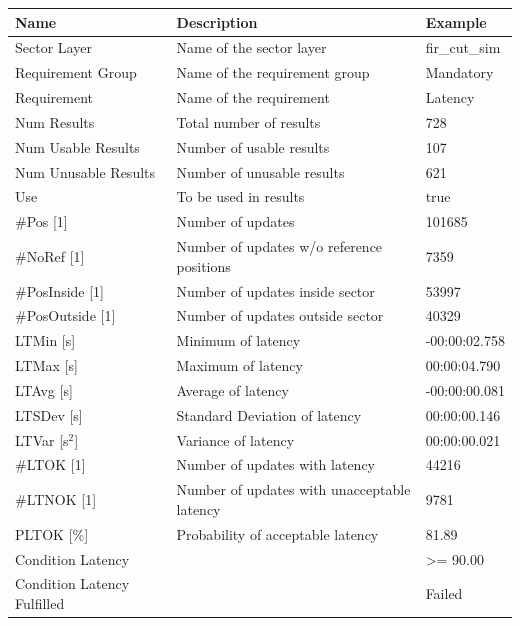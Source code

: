 \begin{center}
 \begin{table}[H]
  \begin{tabularx}{\textwidth}{ | l | X |  l | }
    \hline
    \textbf{Name} & \textbf{Description} & \textbf{Example} \\ \hline
    Sector Layer & Name of the sector layer & fir\_cut\_sim \\ \hline
    Requirement Group & Name of the requirement group & Mandatory \\ \hline
    Requirement & Name of the requirement & Latency \\ \hline
    Num Results & Total number of results & 728 \\ \hline
    Num Usable Results & Number of usable results & 107 \\ \hline
    Num Unusable Results & Number of unusable results & 621 \\ \hline
    Use & To be used in results & true \\ \hline
    \#Pos [1] & Number of updates & 101685 \\ \hline
    \#NoRef [1] & Number of updates w/o reference positions & 7359 \\ \hline
    \#PosInside [1] & Number of updates inside sector & 53997 \\ \hline
    \#PosOutside [1] & Number of updates outside sector & 40329 \\ \hline
    LTMin [s] & Minimum of latency & -00:00:02.758 \\ \hline
    LTMax [s] & Maximum of latency & 00:00:04.790 \\ \hline
    LTAvg [s] & Average of latency & -00:00:00.081 \\ \hline
    LTSDev [s] & Standard Deviation of latency & 00:00:00.146 \\ \hline
    LTVar [s$^2$] & Variance of latency & 00:00:00.021 \\ \hline
    \#LTOK [1] & Number of updates with latency & 44216 \\ \hline
    \#LTNOK [1] & Number of updates with unacceptable latency  & 9781 \\ \hline
    PLTOK [\%] & Probability of acceptable latency & 81.89 \\ \hline
    Condition Latency &  & >= 90.00 \\ \hline
    Condition Latency Fulfilled &  & Failed \\ \hline
\end{tabularx}
\end{table}
\end{center}

